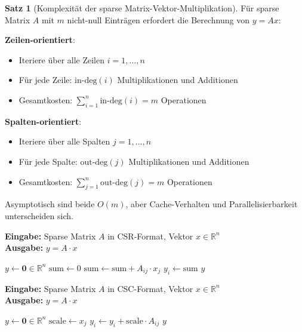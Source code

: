 ﻿\documentclass[a4paper,12pt]{report}
\theoremstyle{definition}
\newtheorem{satz}{Satz}
\begin{document}
	\begin{satz}[Komplexität der sparse Matrix-Vektor-Multiplikation]
		Für sparse Matrix $A$ mit $m$ nicht-null Einträgen erfordert die Berechnung von $y = Ax$:
		
		\textbf{Zeilen-orientiert}:
		\begin{itemize}
			\item Iteriere über alle Zeilen $i = 1,\ldots,n$
			\item Für jede Zeile: $\text{in-deg}(i)$ Multiplikationen und Additionen
			\item Gesamtkosten: $\sum_{i=1}^n \text{in-deg}(i) = m$ Operationen
		\end{itemize}
		
		\textbf{Spalten-orientiert}:
		\begin{itemize}
			\item Iteriere über alle Spalten $j = 1,\ldots,n$
			\item Für jede Spalte: $\text{out-deg}(j)$ Multiplikationen und Additionen
			\item Gesamtkosten: $\sum_{j=1}^n \text{out-deg}(j) = m$ Operationen
		\end{itemize}
		
		Asymptotisch sind beide $O(m)$, aber Cache-Verhalten und Parallelisierbarkeit unterscheiden sich.
	\end{satz}
	
	\begin{algorithm}[H]
		\caption{Zeilen-orientierte sparse Matrix-Vektor-Multiplikation}
		\label{alg:row-matvec}
		\textbf{Eingabe:} Sparse Matrix $A$ in CSR-Format, Vektor $x \in \mathbb{R}^n$ \\
		\textbf{Ausgabe:} $y = A \cdot x$
		\begin{algorithmic}[1]
			\State $y \gets \mathbf{0} \in \mathbb{R}^n$
			\State $\text{sum} \gets 0$
			\State $\text{sum} \gets \text{sum} + A_{ij} \cdot x_j$
			\EndFor
			\State $y_i \gets \text{sum}$
			\EndFor
			\State \Return $y$
		\end{algorithmic}
	\end{algorithm}
	
	\begin{algorithm}[H]
		\caption{Spalten-orientierte sparse Matrix-Vektor-Multiplikation}
		\label{alg:column-matvec-detailed}
		\textbf{Eingabe:} Sparse Matrix $A$ in CSC-Format, Vektor $x \in \mathbb{R}^n$ \\
		\textbf{Ausgabe:} $y = A \cdot x$
		\begin{algorithmic}[1]
			\State $y \gets \mathbf{0} \in \mathbb{R}^n$
			\State $\text{scale} \gets x_j$
			\State $y_i \gets y_i + \text{scale} \cdot A_{ij}$
			\EndFor
			\EndIf
			\EndFor
			\State \Return $y$
		\end{algorithmic}
	\end{algorithm}
	
\end{document}
